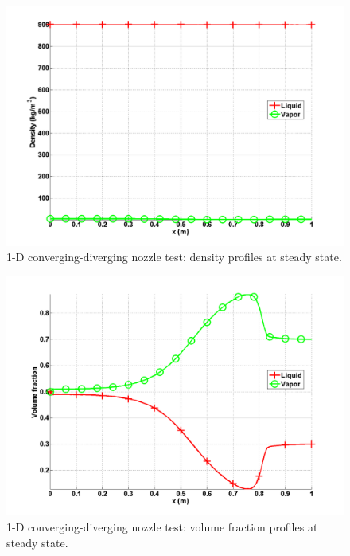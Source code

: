 %
\begin{figure}[H]
\centering
\includegraphics[width=\textwidth]{figures/SEM/Aint1e4_two_phases_density.png}
\caption{1-D converging-diverging nozzle test: density profiles at steady state.}
\label{fig:two-fluids-rel-nozzle-rho-sem-sect4}
\end{figure}
%
\begin{figure}[H]
\centering
\includegraphics[width=\textwidth]{figures/SEM/Aint1e4_two_phases_volume_fraction.png}
\caption{1-D converging-diverging nozzle test: volume fraction profiles at steady state.}
\label{fig:two-fluids-rel-nozzle-vf-sem-sect4}
\end{figure}
%
